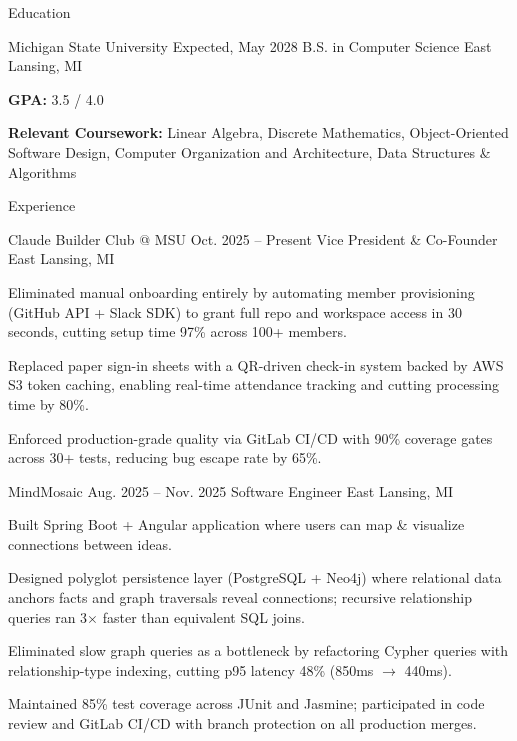 \documentclass[
	11pt
]{../../../resume}
\begin{document}
	\begin{rSection}{E}{ducation}
		\begin{rSectionEntry}
			{Michigan State University}
			{Expected, May 2028}
			{B.S. in Computer Science}
			{}
			{East Lansing, MI}

			\item \textbf{GPA:} 3.5 / 4.0
			\item \textbf{Relevant Coursework:} Linear Algebra, Discrete Mathematics, Object-Oriented Software Design, Computer Organization and Architecture, Data Structures \& Algorithms
		\end{rSectionEntry}
	\end{rSection}

	\begin{rSection}{E}{xperience}
		\begin{rSectionEntry}
			{Claude Builder Club @ MSU}
			{Oct. 2025 -- Present}
			{Vice President \& Co-Founder}
			{}
			{East Lansing, MI}

			\item Eliminated manual onboarding entirely by automating member provisioning (GitHub API + Slack SDK) to grant full repo and workspace access in 30 seconds, cutting setup time 97\% across 100+ members.
			\item Replaced paper sign-in sheets with a QR-driven check-in system backed by AWS S3 token caching, enabling real-time attendance tracking and cutting processing time by 80\%.
			\item Enforced production-grade quality via GitLab CI/CD with 90\% coverage gates across 30+ tests, reducing bug escape rate by 65\%.
		\end{rSectionEntry}

		\begin{rSectionEntry}
			{MindMosaic}
			{Aug. 2025 -- Nov. 2025}
			{Software Engineer}
			{}
			{East Lansing, MI}

			\item Built Spring Boot + Angular application where users can map \& visualize connections between ideas.
			\item Designed polyglot persistence layer (PostgreSQL + Neo4j) where relational data anchors facts and graph traversals reveal connections; recursive relationship queries ran 3$\times$ faster than equivalent SQL joins.
			\item Eliminated slow graph queries as a bottleneck by refactoring Cypher queries with relationship-type indexing, cutting p95 latency 48\% (850ms $\rightarrow$ 440ms).
			\item Maintained 85\% test coverage across JUnit and Jasmine; participated in code review and GitLab CI/CD with branch protection on all production merges.
		\end{rSectionEntry}
	\end{rSection}
\end{document}
